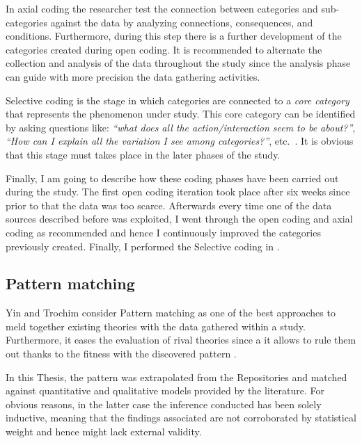 In axial coding the researcher test the connection between categories and sub-categories against the data by analyzing connections, consequences, and conditions. Furthermore, during this step there is a further development of the categories created during open coding. It is recommended to alternate the collection and analysis of the data throughout the study since the analysis phase can guide with more precision the data gathering activities.

Selective coding is the stage in which categories are connected to a \textit{core category} that represents the phenomenon under study. This core category can be identified by asking questions like: \textit{``what does all the action/interaction seem to be about?''}, \textit{``How can I explain all the variation I see among categories?''}, etc.\ \cite{coding_guidelines}. It is obvious that this stage must takes place in the later phases of the study.

Finally, I am going to describe how these coding phases have been carried out during the study. The first open coding iteration took place after six weeks since prior to that the data was too scarce. Afterwards every time one of the data sources described before was exploited, I went through the open coding and axial coding as recommended and hence  I continuously improved the categories previously created. Finally, I performed the Selective coding in .


\subsection{Pattern matching}
Yin \cite{case_study_guide} and Trochim \cite{pattern_matching} consider Pattern matching as one of the best approaches to meld together existing theories with the data gathered within a study. Furthermore, it eases the evaluation of rival theories since a it allows to rule them out thanks to the fitness with the discovered pattern \cite{pattern_matching}.

In this Thesis, the pattern was extrapolated from the Repositories and matched against quantitative and qualitative models provided by the literature. For obvious reasons, in the latter case the inference conducted has been solely inductive, meaning that the findings associated are not corroborated by statistical weight and hence might lack external validity.


